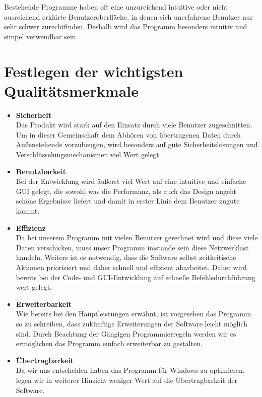 \documentclass[a4paper,12pt]{scrreprt}
\begin{document}
	Bestehende Programme haben oft eine unzureichend intuitive oder nicht ausreichend erklärte Benutzeroberfläche, in denen sich unerfahrene Benutzer nur sehr schwer zurechtfinden. Deshalb wird das Programm besonders intuitiv und simpel verwendbar sein.
	
	
		
	\section{Festlegen der wichtigsten Qualit\"atsmerkmale}
		\begin{itemize}
			\item {\LARGE\textbf{Sicherheit}}\\
		Das Produkt wird stark auf den Einsatz durch viele Benutzer zugeschnitten. Um in dieser Gemeinschaft dem Abhören von übertragenen Daten durch Außenstehende vorzubeugen, wird besonders auf gute Sicherheitslösungen und Verschlüsselungsmechanismen viel Wert gelegt. 
			\item {\LARGE\textbf{Benutzbarkeit}}\\
			Bei der Entwicklung wird äußerst viel Wert auf eine intuitive und einfache GUI gelegt, die sowohl was die Performanz, als auch das Design angeht schöne Ergebnisse liefert und damit in erster Linie dem Benutzer zugute kommt. 
			
			\item {\LARGE\textbf{Effizienz}}\\
		Da bei unserem Programm  mit vielen Benutzer gerechnet wird und diese  viele Daten verschicken, muss unser Programm  imstande sein diese Netzwerklast handeln. Weiters ist es notwendig, dass die Software selbst zeitkritische Aktionen priorisiert und daher schnell und effizient abarbeitet. Daher wird bereits bei der Code- und GUI-Entwicklung auf schnelle Befehlsdurchführung wert gelegt.
		
		
			\item {\LARGE\textbf{Erweiterbarkeit}}\\
		Wie bereits bei den Hauptleistungen erwähnt, ist vorgesehen das Programm so zu schreiben, dass zukünftige Erweiterungen der Software leicht möglich sind. Durch Beachtung der Gängigen Programmierregeln werden wir es ermöglichen das Programm einfach erweiterbar zu gestalten.
		
			\item {\LARGE\textbf{Übertragbarkeit}}	\\
			Da wir uns entscheiden haben das Programm für Windows zu optimieren, legen wir in weiterer Hinsicht weniger Wert auf die Übertragbarkeit der Software.
			
			\end{itemize}
\end{document}
